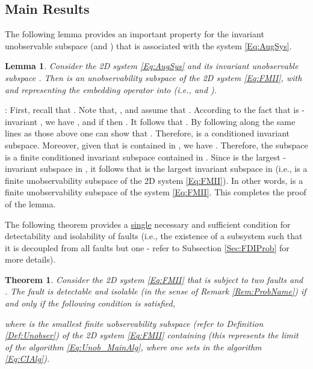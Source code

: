 \documentclass[journal,12pt,draftcls,onecolumn]{IEEEtran}
\def\QEDclosed{\hfill\IEEEQEDclosed}
\renewcommand{\qed}{\QEDclosed}
\renewenvironment{proof}[1][\proofname]{\noindent\nobreakspace{\bfseries #1}:\;}{\qed\par}
\newtheorem{theorem}{Theorem}
\newtheorem{lemma}{Lemma}
\begin{document}
\subsection{Main Results}\label{Sec:FDIMainResult}
The following lemma provides an important property for the invariant unobservable subspace  (and ) that is associated with the system \eqref{Eq:AugSys}.
\begin{lemma}\label{Lem:UnobsTot2Small}
	Consider the 2D system \eqref{Eq:AugSys} and its invariant unobservable subspace . Then  is an unobservability subspace of the 2D system \eqref{Eq:FMII}, with  and  representing the embedding operator into  (i.e.,  and ).
\end{lemma}
\begin{proof}
	First, recall that .
	Note that, , and assume that . According to the fact that  is -invariant \cite{ACC2013}, we have , and if  then . It follows that . By following along the same lines as those above one can show that . Therefore,  is a conditioned invariant subspace.
	Moreover, given that  is contained in , we have . Therefore, the subspace  is a finite conditioned invariant subspace contained in . Since  is the largest -invariant subspace in , it follows that  is the largest  invariant subspace in  (i.e.,  is a finite unobservability subspace of the 2D system \eqref{Eq:FMII}). In other words,  is a finite unobservability subspace of the system \eqref{Eq:FMII}. This completes the proof of the lemma.
\end{proof}
The following theorem provides a \underline{single} necessary and  sufficient condition for detectability and isolability of faults (i.e., the existence  of a subsystem such that it is decoupled from all faults but one - refer to  Subsection \ref{Sec:FDIProb} for more details).
\begin{theorem}\label{Thm:NecSuffFDI}
	Consider the 2D system \eqref{Eq:FMII} that is subject to two faults  and . The fault   is detectable and isolable (in the sense of Remark \ref{Rem:ProbName}) if and only if the following condition is satisfied,
	
	where   is the smallest finite uobservability subspace (refer to Definition \ref{Def:Unobser}) of the 2D system \eqref{Eq:FMII} containing  (this represents the limit of the algorithm \eqref{Eq:Unob_MainAlg}, where one sets  in the algorithm \eqref{Eq:CIAlg}).\qed
\end{theorem}
\end{document}
